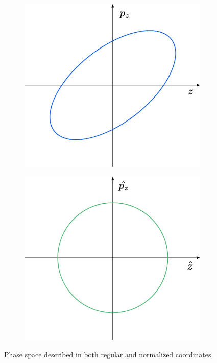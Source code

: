 \begin{figure}[H]
    \centering
    \begin{subfigure}[b]{0.4\textwidth}
        \includegraphics[width=\linewidth]{images/phase_space_regular_coordinates.pdf}
    \end{subfigure}
    \begin{subfigure}[b]{0.4\textwidth}
        \includegraphics[width=\linewidth]{images/phase_space_normalized_coordinates.pdf}
    \end{subfigure}
    \caption{Phase space described in both regular and normalized coordinates.}
    \label{fig:coordinate_systems:normalized_coordinates}
\end{figure}


